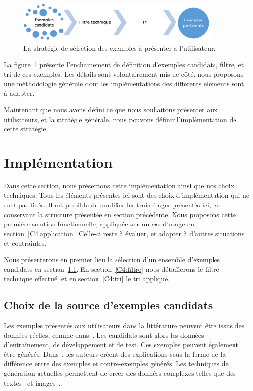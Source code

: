 \begin{figure}[h!tpb]
 \centering \includegraphics[width=0.9\textwidth]{S4-Explicabilite_globale/figures/strategie.png}
\caption{La stratégie de sélection des exemples à présenter à l'utilisateur.} \label{fig:strategie}
\end{figure}

La figure~\ref{fig:strategie} présente l'enchainement de définition d'exemples candidats, filtre, et tri de ces exemples. Les détails sont volontairement mis de côté, nous proposons une méthodologie générale dont les implémentations des différents éléments sont à adapter.

Maintenant que nous avons défini ce que nous souhaitons présenter aux utilisateurs, et la stratégie générale, nous pouvons définir l'implémentation de cette stratégie.

\section{Implémentation} \label{C4:implémentation}

Dans cette section, nous présentons cette implémentation ainsi que nos choix techniques.
Tous les éléments présentés ici sont des choix d'implémentation qui ne sont pas fixés. Il est possible de modifier les trois étages présentés ici, en conservant la structure présentée en section précédente.
Nous proposons cette première solution fonctionnelle, appliquée sur un cas d'usage en section~\ref{C4:application}. Celle-ci reste à évaluer, et adapter à d'autres situations et contraintes.

 Nous présenterons en premier lieu la sélection d'un ensemble d'exemples candidats en section~\ref{C4:candidats}. En section~\ref{C4:filtre} nous détaillerons le filtre technique effectué, et en section~\ref{C4:tri} le tri appliqué.

\subsection{Choix de la source d'exemples candidats} \label{C4:candidats}

Les exemples présentés aux utilisateurs dans la littérature peuvent être issus des données réelles, comme dans~\cite{Ribeiro2016}. Les candidats sont alors les données d'entraînement, de développement et de test. Ces exemples peuvent également être générés. Dans~\cite{Charachon2021}, les auteurs créent des explications sous la forme de la différence entre des exemples et contre-exemples générés. Les techniques de génération actuelles permettent de créer des données complexes telles que des textes~\cite{Wang2021} et images~\cite{Ramesh2022}.

